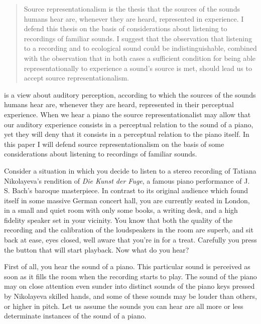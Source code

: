 \documentclass[sloppy, journal, git, bytitle, dodraft]{humapap}
\begin{document}
\documenttitle

\begin{abstract}
Source representationalism is the thesis that the sources of the sounds humans hear are, whenever they are heard, represented in experience. I defend this thesis on the basis of considerations about listening to recordings of familiar sounds. I suggest that the observation that listening to a recording and to ecological sound could be indistinguishable, combined with the observation that in both cases a sufficient condition for being able representationally to experience a sound's source is met, should lead us to accept source representationalism. 
\end{abstract}	

 is a view about auditory perception, according to which the sources of the sounds humans hear are, whenever they are heard, represented in their perceptual experience. When we hear a piano the source representationalist may allow that our auditory experience consists in a perceptual relation to the sound of a piano, yet they will deny that it consists in a perceptual relation to the piano itself. In this paper I will defend source representationalism on the basis of some considerations about listening to recordings of familiar sounds.

\sect Consider a situation in which you decide to listen to a stereo recording of Tatiana Nikolayeva's rendition of \emph{Die Kunst der Fuge}, a famous piano performance of J. S. Bach's baroque masterpiece. In contrast to its original audience which found itself in some massive German concert hall, you are currently seated in London, in a small and quiet room with only some books, a writing desk, and a high fidelity speaker set in your vicinity. You know that both the quality of the recording and the calibration of the loudspeakers in the room are superb, and sit back at ease, eyes closed, well aware that you're in for a treat. Carefully you press the button that will start playback. Now what do you hear? 

\sect First of all, you hear the sound of a piano. This particular sound is perceived as soon as it fills the room when the recording starts to play. The sound of the piano may on close attention even sunder into distinct sounds of the piano keys pressed by Nikolayeva skilled hands, and some of these sounds may be louder than others, or higher in pitch. Let us assume the sounds you can hear are all more or less determinate instances of the sound of a piano.
\end{document}
